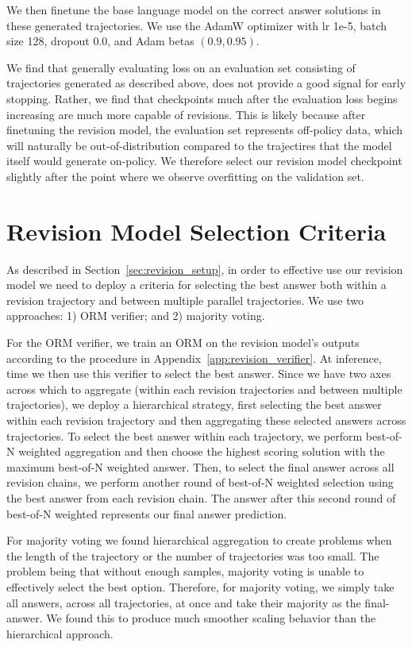 \documentclass[11pt, letterpaper, logo]{googledeepmind}
\begin{document}
We then finetune the base language model on the correct answer solutions in these generated trajectories. We use the AdamW optimizer with lr 1e-5, batch size 128, dropout 0.0, and Adam betas $(0.9, 0.95)$.

We find that generally evaluating loss on an evaluation set consisting of trajectories generated as described above, does not provide a good signal for early stopping. Rather, we find that checkpoints much after the evaluation loss begins increasing are much more capable of revisions. This is likely because after finetuning the revision model, the evaluation set represents off-policy data, which will naturally be out-of-distribution compared to the trajectires that the model itself would generate on-policy. We therefore select our revision model checkpoint slightly after the point where we observe overfitting on the validation set.

\section{Revision Model Selection Criteria}
\label{app:revision_selection}

As described in Section~\ref{sec:revision_setup}, in order to effective use our revision model we need to deploy a criteria for selecting the best answer both within a revision trajectory and between multiple parallel trajectories. We use two approaches: 1) ORM verifier; and 2) majority voting.

For the ORM verifier, we train an ORM on the revision model's outputs according to the procedure in Appendix~\ref{app:revision_verifier}. At inference, time we then use this verifier to select the best answer. Since we have two axes across which to aggregate (within each revision trajectories and between multiple trajectories), we deploy a hierarchical strategy, first selecting the best answer within each revision trajectory and then aggregating these selected answers across trajectories. To select the best answer within each trajectory, we perform best-of-N weighted aggregation and then choose the highest scoring solution with the maximum best-of-N weighted answer. Then, to select the final answer across all revision chains, we perform another round of best-of-N weighted selection using the best answer from each revision chain. The answer after this second round of best-of-N weighted represents our final answer prediction.

For majority voting we found hierarchical aggregation to create problems when the length of the trajectory or the number of trajectories was too small. The problem being that without enough samples, majority voting is unable to effectively select the best option. Therefore, for majority voting, we simply take all answers, across all trajectories, at once and take their majority as the final-answer. We found this to produce much smoother scaling behavior than the hierarchical approach.
\end{document}

